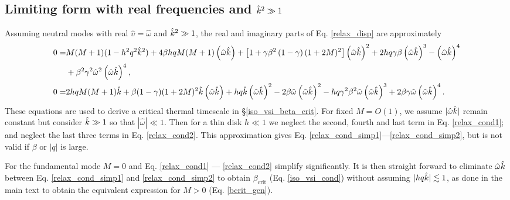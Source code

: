 \subsection{Limiting form with real frequencies and $\hat{k}^2\gg 1$}\label{disp_neut_limit}
Assuming neutral modes with real $\hat{\upsilon}=\hat{\omega}$ and $\hat{k}^2\gg 1$, the real and imaginary parts of
Eq. \ref{relax_disp} are approximately 
\begin{align}
  0 =&M(M+1)(1-h^2 q^2 \hat{k}^2) + 4\beta h q M(M+1)\left(\hat{\omega}\hat{k}\right) 
 +\left[1 +
    \gamma\beta^2\left(1-\gamma\right)(1+2M)^2\right]\left(\hat{\omega}\hat{k}\right)^2
 + 2h q \gamma\beta \left(\hat{\omega}\hat{k}\right)^3 -  \left(\hat{\omega}\hat{k}\right)^4\notag \\
  &+ \beta^2\gamma^2\hat{\omega}^2
  \left(\hat{\omega}\hat{k}\right)^4,\label{relax_cond1} \\
   0=& 2h q M (M+1)\hat{k} +
   \beta(1-\gamma)(1+2M)^2\hat{k}\left(\hat{\omega}\hat{k}\right) 
   + h q \hat{k} \left(\hat{\omega}\hat{k}\right)^2 -
   2\beta\hat{\omega}\left(\hat{\omega}\hat{k}\right)^2
   - h q
   \gamma^2\beta^2\hat{\omega}\left(\hat{\omega}\hat{k}\right)^3 
   +
   2\beta\gamma\hat{\omega}\left(\hat{\omega}\hat{k}\right)^4 \label{relax_cond2}. 
\end{align}
These equations are used to derive a critical thermal timescale in
\S\ref{iso_vsi_beta_crit}. For fixed $M=O(1)$,  we assume
$|\hat{\omega}\hat{k}|$ remain constant but consider $\hat{k}\gg 1$ so
that $|\hat{\omega}|\ll 1$.  Then for a thin disk $h \ll 1$
we neglect the second, fourth and last term in Eq. \ref{relax_cond1};
and neglect the last three terms in Eq. \ref{relax_cond2}. This
approximation gives Eq. \ref{relax_cond_simp1}---\ref{relax_cond_simp2},
but is not valid if $\beta$ or $|q|$ is large. 

For the fundamental mode $M=0$ and Eq. \ref{relax_cond1} ---
\ref{relax_cond2} simplify significantly. It is then straight
forward to eliminate $\hat{\omega}\hat{k}$ between 
Eq. \ref{relax_cond_simp1} and \ref{relax_cond_simp2} to obtain
$\beta_\mathrm{crit}$ (Eq. \ref{iso_vsi_cond}) without
assuming $|h q \hat{k}|\lesssim 1$, as done in the main text to obtain the
equivalent expression for $M>0$ (Eq. \ref{bcrit_gen}).





